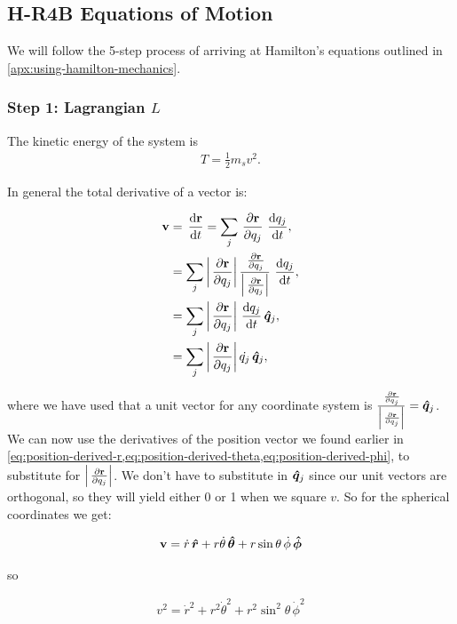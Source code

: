 \subsection{H-R4B Equations of Motion}
We will follow the 5-step process of arriving at Hamilton's equations outlined in \cref{apx:using-hamilton-mechanics}.

\subsubsection{Step 1: Lagrangian \(L\)}
The kinetic energy of the system is
\begin{align}
    T = \frac{1}{2} m_s v^2.
\end{align}

In general the total derivative of a vector is:

\begin{align}
    \mathbf{v} &= \operatorname{}\frac{\mathrm{d} \mathbf{r}}{\mathrm{d} t} = \sum\limits_{j} \operatorname{}\frac{\partial \mathbf{r}}{\partial q_j} \operatorname{}\frac{\mathrm{d} q_j}{\mathrm{d} t}, \\
      &= \sum\limits_{j} \left|\operatorname{}\frac{\partial \mathbf{r}}{\partial q_j}\right| \frac{\operatorname{}\frac{\partial \mathbf{r}}{\partial q_j}}{\left|\operatorname{}\frac{\partial \mathbf{r}}{\partial q_j}\right|} \operatorname{}\frac{\mathrm{d} q_j}{\mathrm{d} t}, \\
      &= \sum\limits_{j} \left|\operatorname{}\frac{\partial \mathbf{r}}{\partial q_j}\right| \operatorname{}\frac{\mathrm{d} q_j}{\mathrm{d} t} \operatorname{}\!\bm{\hat{q}}_j, \\
      &= \sum\limits_{j} \left|\operatorname{}\frac{\partial \mathbf{r}}{\partial q_j}\right| \dot{q_j} \operatorname{}\!\bm{\hat{q}}_j,
    \end{align}

where we have used that a unit vector for any coordinate system is \(\frac{\operatorname{}\frac{\partial \mathbf{r}}{\partial q_j}}{\left|\operatorname{}\frac{\partial \mathbf{r}}{\partial q_j}\right|} = \operatorname{}\!\bm{\hat{q}}_j\).
We can now use the derivatives of the position vector we found earlier in \cref{eq:position-derived-r,eq:position-derived-theta,eq:position-derived-phi}, to substitute for \(\left|\operatorname{}\frac{\partial \mathbf{r}}{\partial q_j}\right|\). We don't have to substitute in \(\operatorname{}\!\bm{\hat{q}}_j\) since our unit vectors are orthogonal, so they will yield either 0 or 1 when we square \(v\). So for the spherical coordinates we get:

\begin{align}
    \mathbf{v} = \dot{r}\operatorname{}\!\bm{\hat{r}} + r\dot{\theta}\operatorname{}\!\bm{\hat{\theta}} + r\sin{\theta}\,\dot{\phi}\operatorname{}\!\bm{\hat{\phi}}
\end{align}

so

\begin{align}
    v^2 = \dot{r}^2 + r^2\dot{\theta}^2 + r^2\sin^2{\theta}\,\dot{\phi}^2
\end{align}

